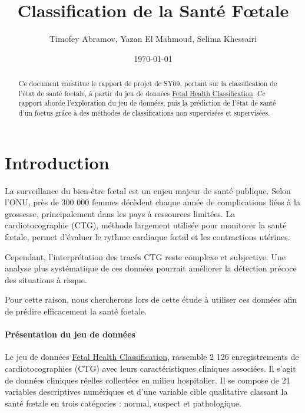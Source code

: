 \documentclass[twocolumn,10pt]{article}
\title{Classification de la Santé Fœtale}
\author{Timofey Abramov, Yazan El Mahmoud, Selima Khessairi}
\date{\today}
\begin{document}
\maketitle %
\thispagestyle{fancy} %

\begin{abstract}

Ce document constitue le rapport de projet de SY09, portant sur la classification de l'état de santé foetale, à partir du jeu de données \href{https://www.kaggle.com/datasets/andrewmvd/fetal-health-classification?select=fetal_health.csv}{Fetal Health Classification}. Ce rapport aborde l'exploration du jeu de données, puis la prédiction de l'état de santé d'un foetus grâce à des méthodes de classifications non supervisées et supervisées.

\end{abstract}



\section*{Introduction}

La surveillance du bien-être fœtal est un enjeu majeur de santé publique. Selon l'ONU, près de 300 000 femmes décèdent chaque année de complications liées à la grossesse, principalement dans les pays à ressources limitées. La cardiotocographie (CTG), méthode largement utilisée pour monitorer la santé fœtale, permet d'évaluer le rythme cardiaque fœtal et les contractions utérines.

Cependant, l'interprétation des tracés CTG reste complexe et subjective. Une analyse plus systématique de ces données pourrait améliorer la détection précoce des situations à risque.

Pour cette raison, nous chercherons lors de cette étude à utiliser ces données afin de prédire efficacement la santé foetale.

\paragraph{Présentation du jeu de données}

Le jeu de données \href{https://www.kaggle.com/datasets/andrewmvd/fetal-health-classification?select=fetal_health.csv}{Fetal Health Classification}, rassemble 2 126 enregistrements de cardiotocographies (CTG) avec leurs caractéristiques cliniques associées. Il s'agit de données cliniques réelles collectées en milieu hospitalier. 
Il se compose de 21 variables descriptives numériques et d'une variable cible qualitative classant la santé fœtale en trois catégories : normal, suspect et pathologique.
\end{document}
